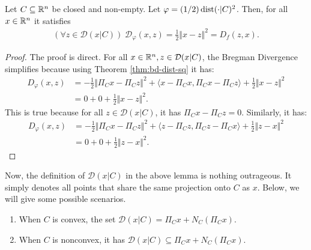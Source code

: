 \documentclass[12pt]{article}
\begin{document}
    \begin{lemma}\label{lemma:conds-dsbd-like-scnvx}
        Let $C \subseteq \mathbb R^n$ be closed and non-empty. 
        Let $\varphi = (1/2)\operatorname{dist}(\cdot | C)^2$.
        Then, for all $x \in \mathbb R^n$ it satisfies
        \begin{align*}
            (\forall z \in \mathcal D(x | C))\; \mathcal D_\varphi(x, z) = \frac{1}{2}\Vert x - z\Vert^2 = D_f(z, x). 
        \end{align*}
    \end{lemma}
    \begin{proof}
        The proof is direct. 
        For all $x \in \mathbb R^n, z \in \mathcal D(x | C)$, the Bregman Divergence simplifies because using Theorem \ref{thm:bd-dist-sq} it has: 
        \begin{align*}
            D_\varphi (x, z) &= 
            - \frac{1}{2}\Vert \Pi_C x - \Pi_C z\Vert^2 
            + \langle x - \Pi_C x, \Pi_C x - \Pi_C z\rangle 
            + \frac{1}{2}\Vert x - z\Vert^2
            \\
            &= 0 + 0 + \frac{1}{2}\Vert x - z\Vert^2. 
        \end{align*}
        This is true because for all $z \in \mathcal D(x | C)$, it has $\Pi_C x - \Pi_C z = 0$. 
        Similarly, it has: 
        \begin{align*}
            D_\varphi(x, z) &= 
            - \frac{1}{2}\Vert \Pi_C x - \Pi_C z\Vert^2 
            + \langle z - \Pi_C z, \Pi_C z - \Pi_C x\rangle
            + \frac{1}{2}\Vert z - x\Vert^2
            \\
            &= 0 + 0 + \frac{1}{2}\Vert z - x\Vert^2. 
        \end{align*}
    \end{proof}
    \par
    Now, the definition of $\mathcal D(x | C)$ in the above lemma is nothing outrageous. 
    It simply denotes all points that share the same projection onto $C$ as $x$. 
    Below, we will give some possible scenarios. 
    \begin{enumerate}
        \item When $C$ is convex, the set $\mathcal D(x | C) = \Pi_C x + N_C(\Pi_C x)$. 
        \item When $C$ is nonconvex, it has $\mathcal D(x | C) \subseteq \Pi_C x + N_C(\Pi_C x)$. 
    \end{enumerate}
\end{document}
